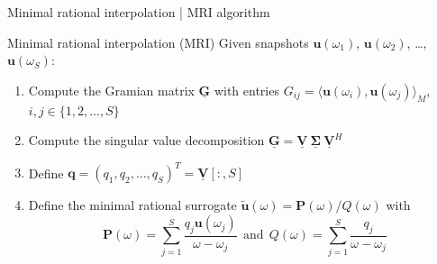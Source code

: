 \documentclass{beamer}
\begin{document}
\begin{frame}{Minimal rational interpolation | MRI algorithm}

    \begin{block}{Minimal rational interpolation (MRI) \cite{greedyMRI}}
        Given snapshots $\mathbf{u}(\omega_1)$, $\mathbf{u}(\omega_2)$, \dots, $\mathbf{u}(\omega_S)$:
        \begin{enumerate}
            \item<2-> Compute the Gramian matrix $\mathbf{\underline{G}}$ with entries $G_{ij} = \langle \mathbf{u}(\omega_i), \mathbf{u}(\omega_j) \rangle_M$, $i,j \in \{1, 2, \dots, S\}$
            \item<3-> Compute the singular value decomposition $\mathbf{\underline{G}} = \mathbf{\underline{V}}~\boldsymbol{\underline{\Sigma}}~\mathbf{\underline{V}}^H$
            \item<4-> Define $\mathbf{q} = (q_1, q_2, \dots, q_S)^T = \mathbf{\underline{V}}[:, S]$
            \item<5-> Define the minimal rational surrogate $\mathbf{\tilde{u}}(\omega) = \mathbf{P}(\omega) / Q(\omega)$ with 
            \begin{equation*}
                \mathbf{P}(\omega) = \sum_{j=1}^S \frac{q_j \mathbf{u}(\omega_j)}{\omega - \omega_j}~~\text{and}~~Q(\omega) = \sum_{j=1}^S \frac{q_j}{\omega - \omega_j}
            \end{equation*}
        \end{enumerate}
    \end{block}

\end{frame}
\end{document}
